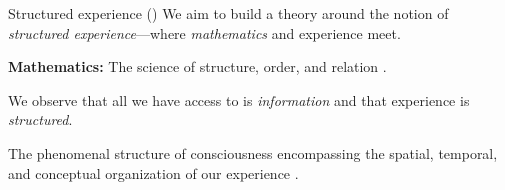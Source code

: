 \begin{frame}[label=intro2]{Structured experience (\SEP)}
 We aim to build a theory around the notion of 
{\em structured experience}---where {\em mathematics} and experience meet.  \vfill

{\bf Mathematics:}  The science of structure, order, and relation  \cite{davisMathematicalExperience1981}.  \vfill

We observe that all we have access to is \textit{information} and that experience is {\em structured}. \vfill

	\begin{definition}
The phenomenal structure of consciousness  encompassing the spatial, temporal, and conceptual organization of our experience  \citep{VanGulick:2016aa}. 
	\end{definition}

	

\end{frame}


    

  

